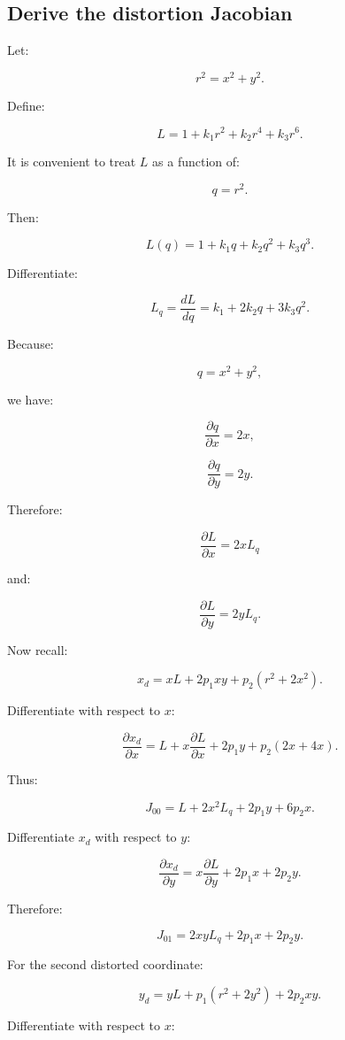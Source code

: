 \subsection{Derive the distortion Jacobian}\label{02-foundations-ii-ch035-derive-the-distortion-jacobian}

Let:

\[
 r^2=x^2+y^2.
\]

Define:

\[
 L=1+k_1r^2+k_2r^4+k_3r^6.
\]

It is convenient to treat \(L\) as a function of:

\[
 q=r^2.
\]

Then:

\[
 L(q)=1+k_1q+k_2q^2+k_3q^3.
\]

Differentiate:

\[
 \boxed{ L_q=\frac{dL}{dq} = k_1+2k_2q+3k_3q^2 }.
\]

Because:

\[
 q=x^2+y^2,
\]

we have:

\[
 \frac{\partial q}{\partial x}=2x,
\]

\[
 \frac{\partial q}{\partial y}=2y.
\]

Therefore:

\[
 \boxed{ \frac{\partial L}{\partial x}=2xL_q }
\]

and:

\[
 \boxed{ \frac{\partial L}{\partial y}=2yL_q }.
\]

Now recall:

\[
 x_d=xL+2p_1xy+p_2(r^2+2x^2).
\]

Differentiate with respect to \(x\):

\[
 \frac{\partial x_d}{\partial x} = L+x\frac{\partial L}{\partial x} +2p_1y +p_2(2x+4x).
\]

Thus:

\[
 \boxed{ J_{00}= L+2x^2L_q+2p_1y+6p_2x }.
\]

Differentiate \(x_d\) with respect to \(y\):

\[
 \frac{\partial x_d}{\partial y} = x\frac{\partial L}{\partial y} +2p_1x +2p_2y.
\]

Therefore:

\[
 \boxed{ J_{01}= 2xyL_q+2p_1x+2p_2y }.
\]

For the second distorted coordinate:

\[
 y_d=yL+p_1(r^2+2y^2)+2p_2xy.
\]

Differentiate with respect to \(x\):

